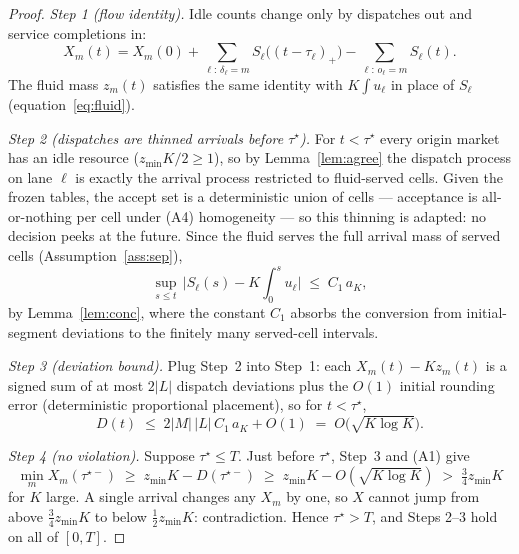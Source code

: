 \documentclass[11pt]{article}
\begin{document}
\begin{proof}
\emph{Step 1 (flow identity).} Idle counts change only by dispatches
out and service completions in:
\begin{equation}
  X_m(t) = X_m(0)
  + \sum_{\ell:\, \delta_{\ell} = m} S_{\ell}\bigl( (t - \tau_{\ell})_+ \bigr)
  - \sum_{\ell:\, o_{\ell} = m} S_{\ell}(t).
\end{equation}
The fluid mass $z_m(t)$ satisfies the same identity with
$K \int u_{\ell}$ in place of $S_{\ell}$
(equation~\eqref{eq:fluid}).

\emph{Step 2 (dispatches are thinned arrivals before $\tau^{\star}$).}
For $t < \tau^{\star}$ every origin market has an idle resource
($z_{\min} K/2 \geq 1$), so by Lemma~\ref{lem:agree} the dispatch
process on lane $\ell$ is exactly the arrival process restricted to
fluid-served cells. Given the frozen tables, the accept set is a
deterministic union of cells --- acceptance is all-or-nothing per cell
under (A4) homogeneity --- so this thinning is adapted: no decision
peeks at the future. Since the fluid serves the full arrival mass of
served cells (Assumption~\ref{ass:sep}),
\begin{equation}
  \sup_{s \leq t}\,
  \bigl| S_{\ell}(s) - K \textstyle\int_0^s u_{\ell} \bigr|
  \;\leq\; C_1\, a_K,
\end{equation}
by Lemma~\ref{lem:conc}, where the constant $C_1$ absorbs the
conversion from initial-segment deviations to the finitely many
served-cell intervals.

\emph{Step 3 (deviation bound).} Plug Step~2 into Step~1: each
$X_m(t) - K z_m(t)$ is a signed sum of at most $2|L|$ dispatch
deviations plus the $O(1)$ initial rounding error (deterministic
proportional placement), so for $t < \tau^{\star}$,
\begin{equation}
  D(t) \;\leq\; 2 |M| \, |L| \, C_1\, a_K + O(1)
  \;=\; O\bigl( \sqrt{K \log K} \bigr).
\end{equation}

\emph{Step 4 (no violation).} Suppose $\tau^{\star} \leq T$. Just
before $\tau^{\star}$, Step~3 and (A1) give
\begin{equation}
  \min_m X_m(\tau^{\star-})
  \;\geq\; z_{\min} K - D(\tau^{\star-})
  \;\geq\; z_{\min} K - O(\sqrt{K \log K})
  \;>\; \tfrac{3}{4} z_{\min} K
\end{equation}
for $K$ large. A single arrival changes any
$X_m$ by one, so $X$ cannot jump from above
$\tfrac{3}{4} z_{\min} K$ to below $\tfrac{1}{2} z_{\min} K$:
contradiction. Hence $\tau^{\star} > T$, and Steps 2--3 hold on all of
$[0, T]$.
\end{proof}
\end{document}
